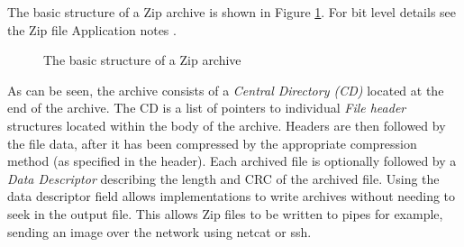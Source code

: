 \documentclass[10pt, conference]{IEEEtran}
\begin{document}
The basic structure of a Zip archive is shown in Figure
\ref{zip_structure}. For bit level details see the Zip file
Application notes \cite{zipspecs}.

\begin{figure}[tb]
  \begin{center}
  \mbox{\columnwidth {}}
  \caption{The basic structure of a Zip archive}
  \label{zip_structure}
  \end{center}
\end{figure}

As can be seen, the archive consists of a {\em Central Directory (CD)}
located at the end of the archive. The CD is a list of pointers to
individual {\em File header} structures located within the body of the
archive. Headers are then followed by the file data, after it has been
compressed by the appropriate compression method (as specified in the
header). Each archived file is optionally followed by a {\em Data
Descriptor} describing the length and CRC of the archived file. Using
the data descriptor field allows implementations to write archives
without needing to seek in the output file. This allows Zip files to
be written to pipes for example, sending an image over the network
using netcat or ssh.
\end{document}

